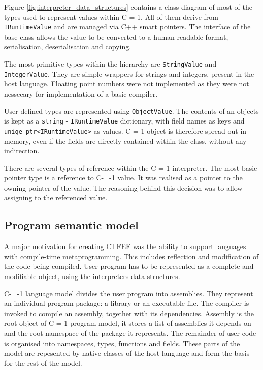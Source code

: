 Figure \ref{fig:interpreter_data_structures} contains a class diagram of most of the types used to represent values within C-=-1.
All of them derive from \lstinline{IRuntimeValue} and are managed via C++ smart pointers.
The interface of the base class allows the value to be converted to a human readable format, serialisation, deserialisation and copying.

The most primitive types within the hierarchy are \lstinline{StringValue} and \lstinline{IntegerValue}.
They are simple wrappers for strings and integers, present in the host language.
Floating point numbers were not implemented as they were not nessecary for implementation of a basic compiler.

User-defined types are represented using \lstinline{ObjectValue}.
The contents of an objects is kept as a \lstinline{string} - \lstinline{IRuntimeValue} dictionary, with field names as keys and \lstinline{uniqe_ptr<IRuntimeValue>} as values.
C-=-1 object is therefore spread out in memory, even if the fields are directly contained within the class, without any indirection.


There are several types of reference within the C-=-1 interpreter.
The most basic pointer type is a reference to C-=-1 value.
It was realised as a pointer to the owning pointer of the value.
The reasoning behind this decision was to allow assigning to the referenced value.

\subsection{Program semantic model}
\label{semantic_model}

A major motivation for creating CTFEF was the ability to support languages with compile-time metaprogramming.
This includes reflection and modification of the code being compiled.
User program has to be represented as a complete and modifiable object, using the interpreters data structures.

C-=-1 language model divides the user program into assemblies.
They represent an individual program package: a library or an executable file.
The compiler is invoked to compile an assembly, together with its dependencies.
Assembly is the root object of C-=-1 program model, it stores a list of assemblies it depends on and the root namespace of the package it represents.
The remainder of user code is organised into namespaces, types, functions and fields.
These parts of the model are repesented by native classes of the host language and form the basis for the rest of the model.

